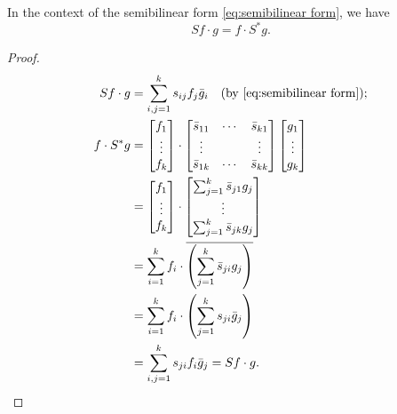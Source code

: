\documentclass[10.5pt, oneside, a4paper]{article}
\begin{document}
\begin{prop}
    In the context of the semibilinear form \eqref{eq:semibilinear form}, we have
    \begin{equation}\label{eq:semibilinear adjoint}
        Sf\cdot g = f\cdot S^*g. 
    \end{equation}
\end{prop}
{\color{blue}
    \begin{proof}
        \begin{align*}
            Sf\cdot g &= \sum_{i,j=1}^k s_{ij}f_j\bar{g}_i \quad\mbox{(by \eqref{eq:semibilinear form})};\\
            f\cdot S^*g &= \begin{bmatrix}
                f_1\\
                \vdots\\
                f_k
            \end{bmatrix}\cdot \begin{bmatrix}
                \bar{s}_{11} & \cdots & \bar{s}_{k1}\\
                \vdots & & \vdots\\
                \bar{s}_{1k} & \cdots & \bar{s}_{kk}
            \end{bmatrix} \begin{bmatrix}
                g_1\\
                \vdots\\
                g_k
            \end{bmatrix}\\
            &= \begin{bmatrix}
                f_1\\
                \vdots\\
                f_k
            \end{bmatrix}\cdot \begin{bmatrix}
                \sum_{j=1}^k \bar{s}_{j1}g_j\\
                \vdots\\
                \sum_{j=1}^k \bar{s}_{jk}g_j
            \end{bmatrix}\\
            &= \sum_{i=1}^k f_i\cdot \overline{\left(\sum_{j=1}^k\bar{s}_{ji}g_j\right)}\\
            &= \sum_{i=1}^k f_i\cdot \left(\sum_{j=1}^k s_{ji}\bar{g}_j\right)\\
            &= \sum_{i,j=1}^k s_{ji}f_i\bar{g}_j = Sf\cdot g.
        \end{align*}
    \end{proof}
}
\end{document}
